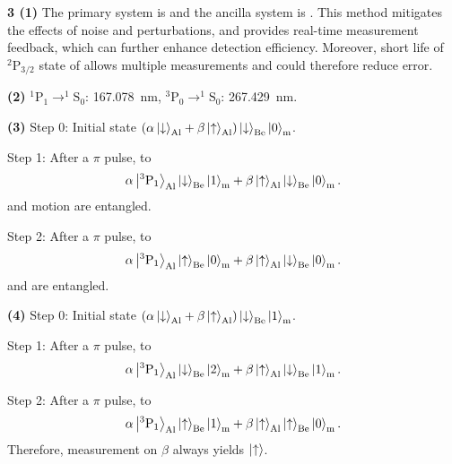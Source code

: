 \documentclass{article}
\makeatletter
\newcommand*{\shifttext}[1]{%
  \settowidth{\@tempdima}{#1}%
  \hspace{-\@tempdima}#1%
}
\newcommand{\plabel}[1]{%
\shifttext{\textbf{#1}\quad}%
}
\newcommand{\prule}{%
\begin{center}%
\hdashrule[0.5ex]{.99\linewidth}{1pt}{1pt 2.5pt}%
\end{center}%
}
\makeatother
\begin{document}
\prule

\plabel{3 (1)}%
The primary system is  and the ancilla system is .
This method mitigates the effects of noise and perturbations, and provides real-time measurement feedback, which can further enhance detection efficiency.
Moreover, short life of $^2\mathrm{P}_{3/2}$ state of  allows multiple measurements and could therefore reduce error.

\plabel{(2)}%
$^1\mathrm{P}_1 \rightarrow ^1\mathrm{S}_0$: \SI{167.078}{\nano\meter},
$^3\mathrm{P}_0 \rightarrow ^1\mathrm{S}_0$: \SI{267.429}{\nano\meter}.

\plabel{(3)}%
Step 0: Initial state $(\alpha\ket{\downarrow}_{\ce{Al}} + \beta\ket{\uparrow}_{\ce{Al}})\ket{\downarrow}_{\ce{Be}}\ket{0}_{\mathrm{m}}$.
\par
Step 1: After a $\pi$ pulse, to
\[ \alpha\ket{^3\mathrm{P}_1}_{\ce{Al}}\ket{\downarrow}_{\ce{Be}}\ket{1}_{\mathrm{m}} + \beta\ket{\uparrow}_{\ce{Al}}\ket{\downarrow}_{\ce{Be}}\ket{0}_{\mathrm{m}}. \]
 and motion are entangled.
\par
Step 2: After a $\pi$ pulse, to
\[ \alpha\ket{^3\mathrm{P}_1}_{\ce{Al}}\ket{\uparrow}_{\ce{Be}}\ket{0}_{\mathrm{m}} + \beta\ket{\uparrow}_{\ce{Al}}\ket{\downarrow}_{\ce{Be}}\ket{0}_{\mathrm{m}}. \]
 and  are entangled.

\plabel{(4)}%
Step 0: Initial state $(\alpha\ket{\downarrow}_{\ce{Al}} + \beta\ket{\uparrow}_{\ce{Al}})\ket{\downarrow}_{\ce{Be}}\ket{1}_{\mathrm{m}}$.
\par
Step 1: After a $\pi$ pulse, to
\[ \alpha\ket{^3\mathrm{P}_1}_{\ce{Al}}\ket{\downarrow}_{\ce{Be}}\ket{2}_{\mathrm{m}} + \beta\ket{\uparrow}_{\ce{Al}}\ket{\downarrow}_{\ce{Be}}\ket{1}_{\mathrm{m}}. \]
\par
Step 2: After a $\pi$ pulse, to
\[ \alpha\ket{^3\mathrm{P}_1}_{\ce{Al}}\ket{\uparrow}_{\ce{Be}}\ket{1}_{\mathrm{m}} + \beta\ket{\uparrow}_{\ce{Al}}\ket{\uparrow}_{\ce{Be}}\ket{0}_{\mathrm{m}}. \]
Therefore, measurement on $\beta$ always yields $\ket{\uparrow}$.
\end{document}
